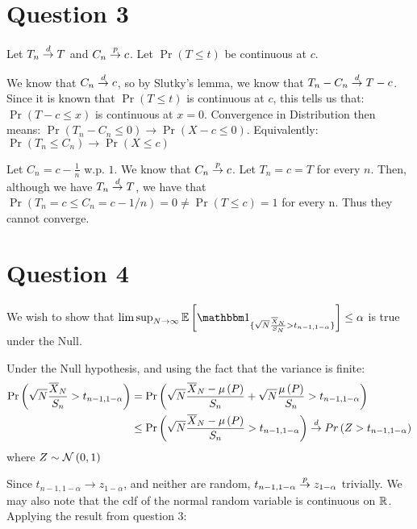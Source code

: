 \documentclass[12pt]{paper}
\begin{document}
\section*{Question 3}
Let $T_n \overset{d}{\to} T$ and $C_n \overset{p}{\to} c$. Let $\Pr( T \leq t)$ be
continuous at $c$.

We know that $C_n \overset{d}{\to} c$, so by Slutky's lemma, we know that
$T_n - C_n \overset{d}{\to} T - c$.  Since it is known that $\Pr( T \leq t )$ is
continuous at $c$, this tells us that: $\Pr( T - c \leq x)$ is continuous
at $x = 0$. Convergence in Distribution then means:
$\Pr( T_n - C_n \leq 0) \rightarrow \Pr( X - c \leq 0)$. Equivalently:
$\Pr( T_n \leq C_n ) \rightarrow \Pr( X \leq c)$
\vspace{.25in}

Let $C_n = c-\frac{1}{n}$ w.p. $1$. We know that $C_n \overset{p}{\to} c$. Let
$T_{n}=c=T$ for every $n$. Then, although we have $T_n\overset{d}{\to} T$, we have that $\Pr(T_n=c\le C_n=c-1/n)=0\ne \Pr(T\le c)=1$ for every n. Thus they cannot converge.


\section*{Question 4}
We wish to show that $\limsup_{N\rightarrow\infty} \exV{\indicate{
    \sqrt{N} \frac{\mean{X}}{S_N} > t_{n-1,1-\alpha}}} \leq \alpha$ is true under
the Null.

Under the Null hypothesis, and using the fact that the variance is
finite:
\begin{align*}
  \Pr\left( \sqrt{N} \frac{\overline{ X }_{N}}{S_n} > t_{n-1,1-\alpha} \right) &= \Pr\left( \sqrt{N}
                                                       \frac{\overline{ X }_{N}
                                                       - \mu\left(P\right)}{S_n} +
                                                       \sqrt{N}\frac{\mu\left(P\right)}{S_n}
                                                       > t_{n-1,1-\alpha}\right)\\
 &\leq \Pr\left( \sqrt{N} \frac{\overline{ X }_{N} - \mu\left(P\right)}{S_n} > t_{n-1,1-\alpha}\right)
  \overset{d}{\to} Pr\left( Z > t_{n-1,1-\alpha}\right)  
\end{align*}
where $Z \sim \mathcal{N}\left(0,1\right)$

Since $t_{n-1,1-\alpha} \rightarrow z_{1-\alpha}$, and neither are random,
$t_{n-1,1-\alpha} \overset{p}{\to} z_{1-\alpha}$ trivially. We may also note that the cdf
of the normal random variable is continuous on $\mathbb{R}$. Applying the result from
question 3: 
\end{document}
